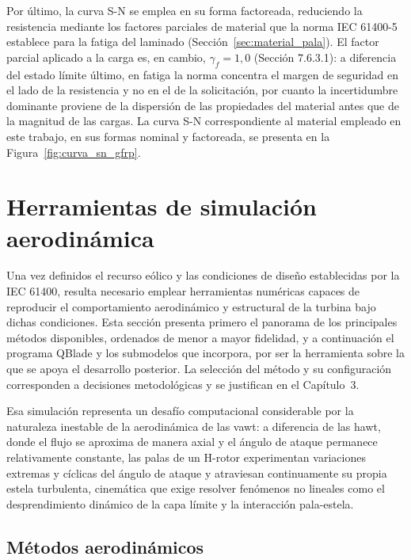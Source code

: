 Por último, la curva S-N se emplea en su forma factoreada, reduciendo la resistencia mediante los factores parciales de material que la norma IEC 61400-5 establece para la fatiga del laminado (Sección~\ref{sec:material_pala}). El factor parcial aplicado a la carga es, en cambio, $\gamma_f = 1{,}0$ (Sección 7.6.3.1): a diferencia del estado límite último, en fatiga la norma concentra el margen de seguridad en el lado de la resistencia y no en el de la solicitación, por cuanto la incertidumbre dominante proviene de la dispersión de las propiedades del material antes que de la magnitud de las cargas. La curva S-N correspondiente al material empleado en este trabajo, en sus formas nominal y factoreada, se presenta en la Figura~\ref{fig:curva_sn_gfrp}.

\section{Herramientas de simulación aerodinámica}
\label{sec:herramientas}

Una vez definidos el recurso eólico y las condiciones de diseño establecidas por la IEC 61400, resulta necesario emplear herramientas numéricas capaces de reproducir el comportamiento aerodinámico y estructural de la turbina bajo dichas condiciones. Esta sección presenta primero el panorama de los principales métodos disponibles, ordenados de menor a mayor fidelidad, y a continuación el programa QBlade y los submodelos que incorpora, por ser la herramienta sobre la que se apoya el desarrollo posterior. La selección del método y su configuración corresponden a decisiones metodológicas y se justifican en el Capítulo~3.

Esa simulación representa un desafío computacional considerable por la naturaleza inestable de la aerodinámica de las \gls{vawt}: a diferencia de las \gls{hawt}, donde el flujo se aproxima de manera axial y el ángulo de ataque permanece relativamente constante, las palas de un H-rotor experimentan variaciones extremas y cíclicas del ángulo de ataque y atraviesan continuamente su propia estela turbulenta, cinemática que exige resolver fenómenos no lineales como el desprendimiento dinámico de la capa límite y la interacción pala-estela.

\subsection{Métodos aerodinámicos}
\label{sec:metodos_aerodinamicos}

